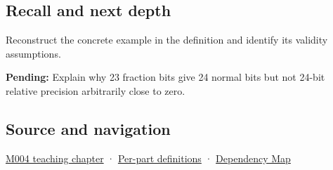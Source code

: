\subsection{Recall and next depth}\label{appendix-a24fd710cf67-recall-and-next-depth}

Reconstruct the concrete example in the definition and identify its validity assumptions.

\textbf{Pending:} Explain why 23 fraction bits give 24 normal bits but not 24-bit relative precision arbitrarily close to zero.

\subsection{Source and navigation}\label{appendix-a24fd710cf67-source-and-navigation}

\hyperref[01-foundations-i-ch001-a-stretching-ruler-for-real-valued-quantities]{M004 teaching chapter} · \hyperref[appendix-fd090d982a15-m004---parts-61-76]{Per-part definitions} · \hyperref[appendix-4ad47bdd269a]{Dependency Map}
